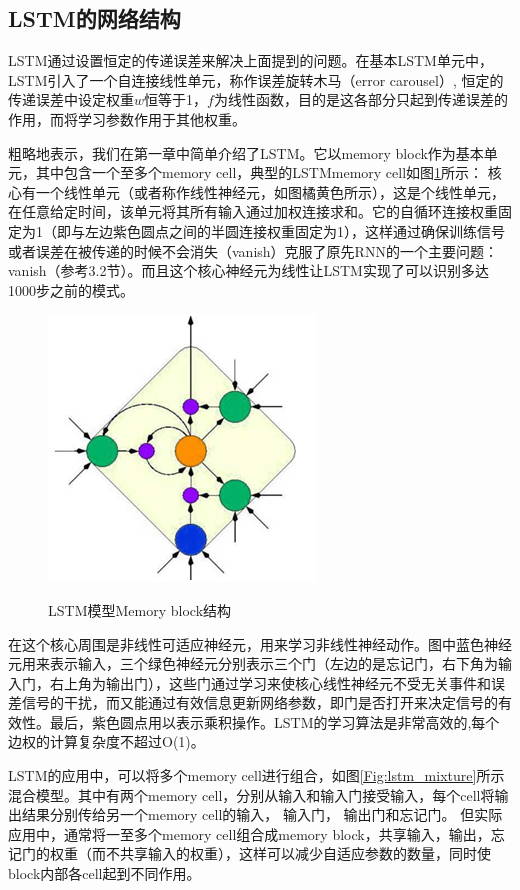 \subsection{LSTM的网络结构}
LSTM通过设置恒定的传递误差来解决上面提到的问题。在基本LSTM单元中，LSTM引入了一个自连接线性单元，称作误差旋转木马（error carousel）, 恒定的传递误差中设定权重$w$恒等于1，$f$为线性函数，目的是这各部分只起到传递误差的作用，而将学习参数作用于其他权重。

粗略地表示，我们在第一章中简单介绍了LSTM。它以memory block作为基本单元，其中包含一个至多个memory cell，典型的LSTMmemory cell如图\ref{Fig:lstm_simple}所示：
核心有一个线性单元（或者称作线性神经元，如图橘黄色所示），这是个线性单元，在任意给定时间，该单元将其所有输入通过加权连接求和。它的自循环连接权重固定为1（即与左边紫色圆点之间的半圆连接权重固定为1），这样通过确保训练信号或者误差在被传递的时候不会消失（vanish）克服了原先RNN的一个主要问题：vanish（参考3.2节）。而且这个核心神经元为线性让LSTM实现了可以识别多达1000步之前的模式。


\begin{figure}[htb]
  \centering
  \includegraphics{Pictures/LSTM/lstm_simple.png}\\
  \caption{LSTM模型Memory block结构}\label{Fig:lstm_simple}
\end{figure}

在这个核心周围是非线性可适应神经元，用来学习非线性神经动作。图中蓝色神经元用来表示输入，三个绿色神经元分别表示三个门（左边的是忘记门，右下角为输入门，右上角为输出门），这些门通过学习来使核心线性神经元不受无关事件和误差信号的干扰，而又能通过有效信息更新网络参数，即门是否打开来决定信号的有效性。最后，紫色圆点用以表示乘积操作。LSTM的学习算法是非常高效的,每个边权的计算复杂度不超过O(1)。


LSTM的应用中，可以将多个memory cell进行组合，如图\ref{Fig:lstm_mixture}所示混合模型。其中有两个memory cell，分别从输入和输入门接受输入，每个cell将输出结果分别传给另一个memory cell的输入， 输入门， 输出门和忘记门。 但实际应用中，通常将一至多个memory cell组合成memory block，共享输入，输出，忘记门的权重（而不共享输入的权重），这样可以减少自适应参数的数量，同时使block内部各cell起到不同作用。 

